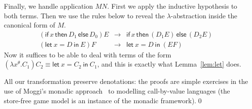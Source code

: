 \documentclass{CSML}
\theoremstyle{definition}\newtheorem{definition}[thm]{Definition}
\theoremstyle{definition}\newtheorem{example}[thm]{Example}
\theoremstyle{definition}\newtheorem{proposition}[thm]{Proposition}
\theoremstyle{definition}\newtheorem{lemma}[thm]{Lemma}
\theoremstyle{definition}\newtheorem{theorem}[thm]{Theorem}
\theoremstyle{definition}\newtheorem{corollary}[thm]{Corollary}
\theoremstyle{definition}\newtheorem{remark}[thm]{Remark}
\newcommand\lrarr\longrightarrow
\newcommand\letin[2]{\mathsf{let}\ #1\ \mathsf{in}\ #2}
\newcommand\cond[3]{\mathsf{if}\,#1\,\mathsf{then}\,#2\,\mathsf{else}\,#3}
\begin{document}
Finally, we handle application $M N$. First we apply the inductive hypothesis to both terms.
Then we use the rules below to reveal the $\lambda$-abstraction inside the canonical form of $M$.
\[\begin{array}{rcl}
(\cond{x}{D_1}{D_0}) E &\!\!\!\lrarr\!\!\! &\cond{x}{(D_1 E)}{(D_2 E)}\\
(\letin{x=D}{E})F &\!\!\!\lrarr\!\!\! &\letin{x=D}{(E F)}
\end{array}\]
Now it suffices to be able to deal with terms of the form $(\lambda x^\theta.C_1) C_2\equiv\letin{x=C_2}{C_1}$,
and this is exactly what Lemma~\ref{lem:let} does.

All our transformation preserve denotations: the proofs are simple exercises in the use of Moggi's monadic
approach~\cite{Mog91} to modelling call-by-value languages (the store-free game model is an instance of the monadic framework).\qed
\end{document}

